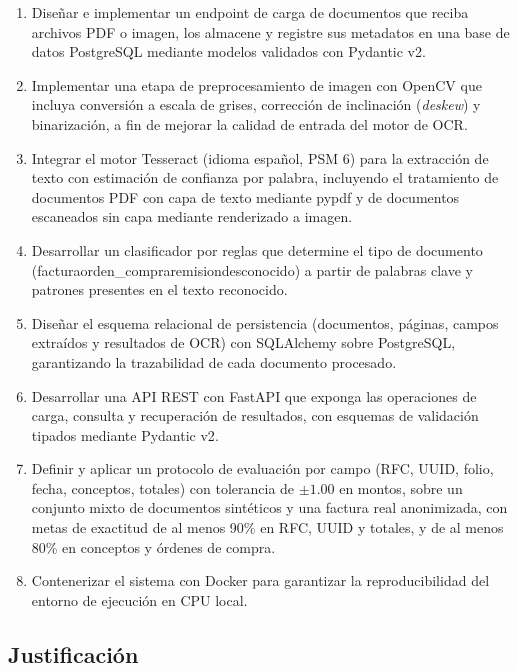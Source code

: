 \begin{enumerate}
    \item Diseñar e implementar un endpoint de carga de documentos que reciba archivos PDF o imagen, los almacene y registre sus metadatos en una base de datos PostgreSQL mediante modelos validados con Pydantic v2.
    \item Implementar una etapa de preprocesamiento de imagen con OpenCV que incluya conversión a escala de grises, corrección de inclinación (\textit{deskew}) y binarización, a fin de mejorar la calidad de entrada del motor de OCR\cite{bradski_opencv_2008, opencv_docs}.
    \item Integrar el motor Tesseract (idioma español, PSM 6) para la extracción de texto con estimación de confianza por palabra, incluyendo el tratamiento de documentos PDF con capa de texto mediante pypdf y de documentos escaneados sin capa mediante renderizado a imagen\cite{tesseract_ocr}.
    \item Desarrollar un clasificador por reglas que determine el tipo de documento (factura\textbar orden\_compra\textbar remision\textbar desconocido) a partir de palabras clave y patrones presentes en el texto reconocido.
    \item Diseñar el esquema relacional de persistencia (documentos, páginas, campos extraídos y resultados de OCR) con SQLAlchemy sobre PostgreSQL, garantizando la trazabilidad de cada documento procesado.
    \item Desarrollar una API REST con FastAPI que exponga las operaciones de carga, consulta y recuperación de resultados, con esquemas de validación tipados mediante Pydantic v2\cite{fastapi_docs, pydantic_v2_2024}.
    \item Definir y aplicar un protocolo de evaluación por campo (RFC, UUID, folio, fecha, conceptos, totales) con tolerancia de $\pm 1.00$ en montos, sobre un conjunto mixto de documentos sintéticos y una factura real anonimizada, con metas de exactitud de al menos 90\% en RFC, UUID y totales, y de al menos 80\% en conceptos y órdenes de compra.
    \item Contenerizar el sistema con Docker para garantizar la reproducibilidad del entorno de ejecución en CPU local\cite{docker_docs}.
\end{enumerate}


\subsection{Justificación} \label{sec:justificacion} %

